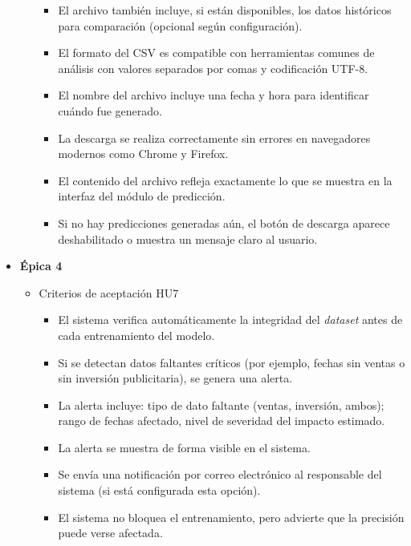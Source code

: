 \documentclass[
11pt, %
]{charter}
\begin{document}
\begin{itemize}
\begin{itemize}
\begin{itemize}
      \item El archivo también incluye, si están disponibles, los datos históricos para comparación (opcional según configuración).

      \item El formato del CSV es compatible con herramientas comunes de análisis con valores separados por comas y codificación UTF-8.

      \item El nombre del archivo incluye una fecha y hora para identificar cuándo fue generado.

      \item La descarga se realiza correctamente sin errores en navegadores modernos como Chrome y Firefox.

      \item El contenido del archivo refleja exactamente lo que se muestra en la interfaz del módulo de predicción.

      \item Si no hay predicciones generadas aún, el botón de descarga aparece deshabilitado o muestra un mensaje claro al usuario.
    \end{itemize}
    \end{itemize}
  \item \textbf{\'{E}pica 4}
    \begin{itemize}
      \item Criterios de aceptación HU7
      
    \begin{itemize}
      \item El sistema verifica automáticamente la integridad del \textit{dataset} antes de cada entrenamiento del modelo.

      \item Si se detectan datos faltantes críticos (por ejemplo, fechas sin ventas o sin inversión publicitaria), se genera una alerta.

      \item La alerta incluye: tipo de dato faltante (ventas, inversión, ambos); rango de fechas afectado, nivel de severidad del impacto estimado.

      \item La alerta se muestra de forma visible en el sistema.

      \item Se envía una notificación por correo electrónico al responsable del sistema (si está configurada esta opción).

      \item El sistema no bloquea el entrenamiento, pero advierte que la precisión puede verse afectada.


\end{itemize}
\end{itemize}
\end{itemize}
\end{document}
